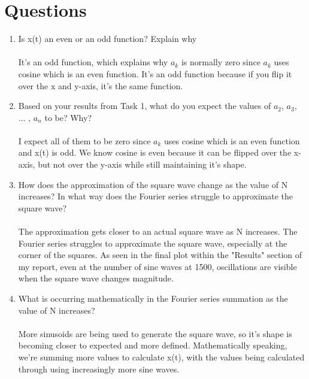 \documentclass[12pt]{report}
\begin{document}
\section{Questions} %
    \begin{enumerate}
        \item  Is x(t) an even or an odd function? Explain why
        \paragraph{} It's an odd function, which explains why $a_k$ is normally zero since $a_k$ uses cosine which is an even function. It's an odd function because if you flip it over the x and y-axis, it's the same function.
        
        \item Based on your results from Task 1, what do you expect the values of $a_2$, $a_3$, ... , $a_n$ to be? Why?
        \paragraph{} I expect all of them to be zero since $a_k$ uses cosine which is an even function and x(t) is odd. We know cosine is even because it can be flipped over the x-axis, but not over the y-axis while still maintaining it's shape.
        
        \item How does the approximation of the square wave change as the value of N increases? In what way does the Fourier series struggle to approximate the square wave?
        \paragraph{} The approximation gets closer to an actual square wave as N increases. The Fourier series struggles to approximate the square wave, especially at the corner of the squares. As seen in the final plot within the "Results" section of my report, even at the number of sine waves at 1500, oscillations are visible when the square wave changes magnitude. 
                
        \item What is occurring mathematically in the Fourier series summation as the value of N increases?
        \paragraph{} More sinusoids are being used to generate the square wave, so it's shape is becoming closer to expected and more defined. Mathematically speaking, we're summing more values to calculate x(t), with the values being calculated through using increasingly more sine waves. 
                

\end{enumerate}
\end{document}
